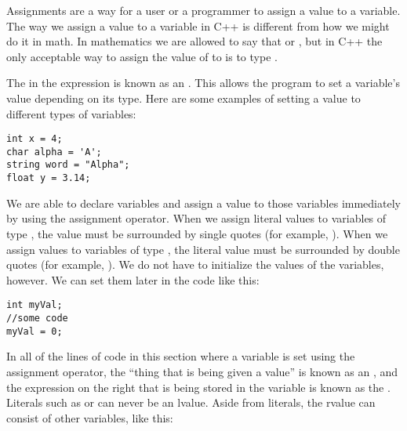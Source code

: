 

Assignments are a way for a user or a programmer to assign a value to a variable. 
The way we assign a value to a variable in C++ is different from how we might do it in math. 
In mathematics we are allowed to say that  or , but in C++ the only acceptable way to assign the value of  to  is to type . 

The \Code{=} in the expression  is known as an . 
This allows the program to set a variable's value depending on its type. 
Here are some examples of setting a value to different types of variables:

\noindent\begin{minipage}{\linewidth}\begin{lstlisting}
int x = 4;
char alpha = 'A';
string word = "Alpha";
float y = 3.14;
\end{lstlisting}\end{minipage}

We are able to declare variables and assign a value to those variables immediately by using the assignment operator. 
When we assign literal values to variables of type , the value must be surrounded by single quotes (for example, ). 
When we assign values to variables of type , the literal value must be surrounded by double quotes (for example, ). 
We do not have to initialize the values of the variables, however. 
We can set them later in the code like this:

\noindent\begin{minipage}{\linewidth}\begin{lstlisting}
int myVal;
//some code
myVal = 0; 
\end{lstlisting}\end{minipage}

In all of the lines of code in this section where a variable is set using the assignment operator, the ``thing that is being given a value'' is known as an , and the expression on the right that is being stored in the variable is known as the . 
Literals such as  or  can never be an lvalue. 
Aside from literals, the rvalue can consist of other variables, like this:

